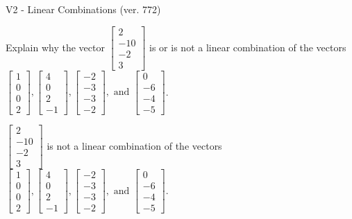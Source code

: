 \begin{exercise}
  \begin{exerciseTitle}V2 - Linear Combinations (ver. 772)\end{exerciseTitle}
  \begin{exerciseStatement}
    Explain why the vector \(\left[\begin{array}{c}
2 \\
-10 \\
-2 \\
3
\end{array}\right]\)  is or is not a linear 
	combination of the vectors \(\left[\begin{array}{c}
1 \\
0 \\
0 \\
2
\end{array}\right] , \left[\begin{array}{c}
4 \\
0 \\
2 \\
-1
\end{array}\right] , \left[\begin{array}{c}
-2 \\
-3 \\
-3 \\
-2
\end{array}\right] , \text{ and } \left[\begin{array}{c}
0 \\
-6 \\
-4 \\
-5
\end{array}\right]\).
	


  \end{exerciseStatement}
  \begin{exerciseAnswer}
   \(\left[\begin{array}{c}
2 \\
-10 \\
-2 \\
3
\end{array}\right]\) 
  	 is not  
	a linear combination of the vectors \(\left[\begin{array}{c}
1 \\
0 \\
0 \\
2
\end{array}\right] , \left[\begin{array}{c}
4 \\
0 \\
2 \\
-1
\end{array}\right] , \left[\begin{array}{c}
-2 \\
-3 \\
-3 \\
-2
\end{array}\right] , \text{ and } \left[\begin{array}{c}
0 \\
-6 \\
-4 \\
-5
\end{array}\right]\).


\end{exerciseAnswer}
\end{exercise}
